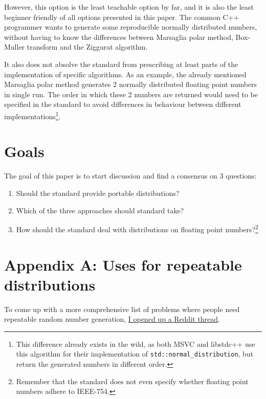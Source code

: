 \documentclass{wg21}
\begin{document}
However, this option is the least teachable option by far, and it is also
the least beginner friendly of all options presented in this paper. The
common C++ programmer wants to generate some reproducible normally
distributed numbers, without having to know the differences between
Marsaglia polar method, Box-Muller transform and the Ziggurat algorithm.

It also does not absolve the standard from prescribing at least parts
of the implementation of specific algorithms. As an example, the already
mentioned Marsaglia polar method generates 2 normally distributed floating
point numbers in single run. The order in which these 2 numbers are returned
would need to be specified in the standard to avoid differences in behaviour
between different implementations\footnote{This difference already exists
in the wild, as both MSVC and libstdc++ use this algorithm for their
implementation of \texttt{std::normal_distribution}, but return
the generated numbers in different order.}.


\hypertarget{goals}{%
    \section{Goals}\label{goals}}

The goal of this paper is to start discussion and find a consensus on 3 questions:

\begin{enumerate}
    \item Should the standard provide portable distributions?
    \item Which of the three approaches should standard take?
    \item How should the standard deal with distributions on floating point numbers?\footnote{Remember that the standard does not even specify whether floating point numbers adhere to IEEE-754.}
\end{enumerate}


\newpage

\appendix

\hypertarget{app-a-uses}{%
    \section{Appendix A: Uses for repeatable distributions}\label{app-a-uses}}

To come up with a more comprehensive list of problems where people need
repeatable random number generation,
\href{https://www.reddit.com/r/cpp/comments/e9mft4/when_did_you_want_to_use_random_but_couldnt/}
{I opened up a Reddit thread}.
\end{document}
